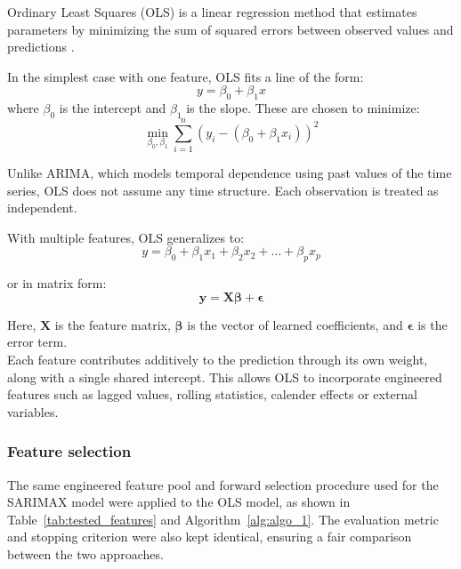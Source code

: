 Ordinary Least Squares (OLS) is a linear regression method that estimates parameters by minimizing the sum of squared errors between observed values and predictions \cite{forecasting_book}.

In the simplest case with one feature, OLS fits a line of the form:
\[
y = \beta_0 + \beta_1 x
\]
where $\beta_0$ is the intercept and $\beta_1$ is the slope. These are chosen to minimize:
\[
\min_{\beta_0, \beta_1} \sum_{i=1}^{n} (y_i - (\beta_0 + \beta_1 x_i))^2
\]

Unlike ARIMA, which models temporal dependence using past values of the time series, OLS does not assume any time structure. Each observation is treated as independent.

With multiple features, OLS generalizes to:
\[
y = \beta_0 + \beta_1 x_1 + \beta_2 x_2 + \dots + \beta_p x_p
\]

or in matrix form:
\[
\mathbf{y} = \mathbf{X}\boldsymbol{\beta} + \boldsymbol{\epsilon}
\]

Here, $\mathbf{X}$ is the feature matrix, $\boldsymbol{\beta}$ is the vector of learned coefficients, and $\boldsymbol{\epsilon}$ is the error term. \\

Each feature contributes additively to the prediction through its own weight, along with a single shared intercept. This allows OLS to incorporate engineered features such as lagged values, rolling statistics, calender effects or external variables. 

\subsubsection{Feature selection}
The same engineered feature pool and forward selection procedure used for the SARIMAX model were applied to the OLS model, as shown in Table~\ref{tab:tested_features} and Algorithm~\ref{alg:algo_1}. The evaluation metric and stopping criterion were also kept identical, ensuring a fair comparison between the two approaches. \\


